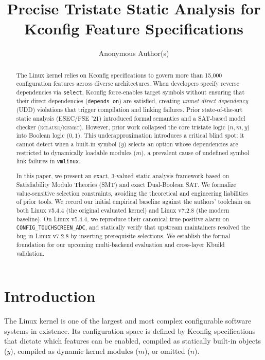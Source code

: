 \documentclass[acmsmall,screen,review,nonacm]{acmart}
\begin{document}
\title{Precise Tristate Static Analysis for Kconfig Feature Specifications}

\author{Anonymous Author(s)}

\begin{abstract}
The Linux kernel relies on Kconfig specifications to govern more than 15,000 configuration features across diverse architectures. When developers specify reverse dependencies via \texttt{select}, Kconfig force-enables target symbols without ensuring that their direct dependencies (\texttt{depends on}) are satisfied, creating \emph{unmet direct dependency} (UDD) violations that trigger compilation and linking failures. Prior state-of-the-art static analysis (ESEC/FSE '21) introduced formal semantics and a SAT-based model checker (\textsc{kclause}/\textsc{kismet}). However, prior work collapsed the core tristate logic ($n, m, y$) into Boolean logic ($0, 1$). This underapproximation introduces a critical blind spot: it cannot detect when a built-in symbol ($y$) selects an option whose dependencies are restricted to dynamically loadable modules ($m$), a prevalent cause of undefined symbol link failures in \texttt{vmlinux}.

In this paper, we present an exact, 3-valued static analysis framework based on Satisfiability Modulo Theories (SMT) and exact Dual-Boolean SAT. We formalize value-sensitive selection constraints, avoiding the theoretical and engineering liabilities of prior tools. We record our initial empirical baseline against the authors' toolchain on both Linux v5.4.4 (the original evaluated kernel) and Linux v7.2.8 (the modern baseline). On Linux v5.4.4, we reproduce their canonical true-positive alarm on \texttt{CONFIG\_TOUCHSCREEN\_ADC}, and statically verify that upstream maintainers resolved the bug in Linux v7.2.8 by inserting prerequisite selections. We establish the formal foundation for our upcoming multi-backend evaluation and cross-layer Kbuild validation.
\end{abstract}

\maketitle

\section{Introduction}
\label{sec:intro}

The Linux kernel is one of the largest and most complex configurable software systems in existence. Its configuration space is defined by Kconfig specifications that dictate which features can be enabled, compiled as statically built-in objects ($y$), compiled as dynamic kernel modules ($m$), or omitted ($n$).
\end{document}
